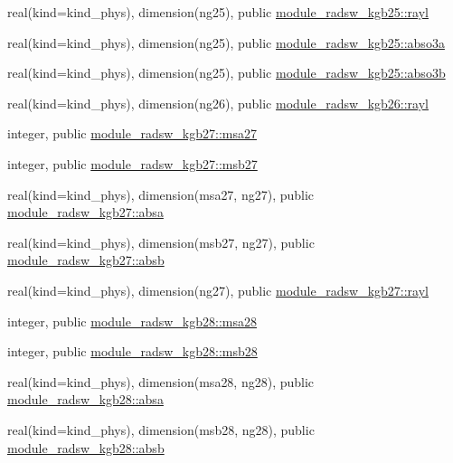 \begin{DoxyCompactItemize}
\item 
real(kind=kind\+\_\+phys), dimension(ng25), public \hyperlink{group__module__radsw__main_ga3d32a0d74d03129cacd9c4bb2e58683a}{module\+\_\+radsw\+\_\+kgb25\+::rayl}
\item 
real(kind=kind\+\_\+phys), dimension(ng25), public \hyperlink{group__module__radsw__main_gab02765dac8ca71a439cdaf1ed2691851}{module\+\_\+radsw\+\_\+kgb25\+::abso3a}
\item 
real(kind=kind\+\_\+phys), dimension(ng25), public \hyperlink{group__module__radsw__main_ga2844cade392c8805b1d418bc1260b3a5}{module\+\_\+radsw\+\_\+kgb25\+::abso3b}
\item 
real(kind=kind\+\_\+phys), dimension(ng26), public \hyperlink{namespacemodule__radsw__kgb26_ab090be57484d2c5b67dda3d83c1c542b}{module\+\_\+radsw\+\_\+kgb26\+::rayl}
\item 
integer, public \hyperlink{namespacemodule__radsw__kgb27_abdab838f66aba14b64bce733f797cf26}{module\+\_\+radsw\+\_\+kgb27\+::msa27}
\item 
integer, public \hyperlink{group__module__radsw__main_ga3b2e57a0d4596aead5cad5aaca74850d}{module\+\_\+radsw\+\_\+kgb27\+::msb27}
\item 
real(kind=kind\+\_\+phys), dimension(msa27, ng27), public \hyperlink{group__module__radsw__main_ga300726e54369a14bfbe6b486f5aab01b}{module\+\_\+radsw\+\_\+kgb27\+::absa}
\item 
real(kind=kind\+\_\+phys), dimension(msb27, ng27), public \hyperlink{group__module__radsw__main_ga8edb349c908e6950e0d18f293dd1b6ea}{module\+\_\+radsw\+\_\+kgb27\+::absb}
\item 
real(kind=kind\+\_\+phys), dimension(ng27), public \hyperlink{group__module__radsw__main_gaca4c6e06d1cd46568048a035c6726f1d}{module\+\_\+radsw\+\_\+kgb27\+::rayl}
\item 
integer, public \hyperlink{namespacemodule__radsw__kgb28_a32c6693eb82a3ed47ed13e07f526471a}{module\+\_\+radsw\+\_\+kgb28\+::msa28}
\item 
integer, public \hyperlink{group__module__radsw__main_ga55d73e39264b431135c6a9c809e20a94}{module\+\_\+radsw\+\_\+kgb28\+::msb28}
\item 
real(kind=kind\+\_\+phys), dimension(msa28, ng28), public \hyperlink{group__module__radsw__main_ga5e48daf035b3b22b6e1b0f36aabcec10}{module\+\_\+radsw\+\_\+kgb28\+::absa}
\item 
real(kind=kind\+\_\+phys), dimension(msb28, ng28), public \hyperlink{group__module__radsw__main_gac3834ddd9d9e2106dc739094c800d09b}{module\+\_\+radsw\+\_\+kgb28\+::absb}

\end{DoxyCompactItemize}
